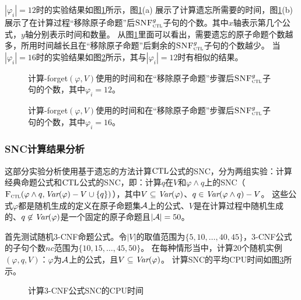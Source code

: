 $|\varphi_i|=12$时的实验结果如图\ref{chapter04:fig:for12}所示，图\ref{chapter04:fig:for12}(a) 展示了计算遗忘所需要的时间，图\ref{chapter04:fig:for12}(b)展示了在计算过程“移除原子命题”后${\textsc{SNF}_{\textsc{ctl}}^g}$子句的个数。其中$x$轴表示第几个公式，$y$轴分别表示时间和数量。
从图\ref{chapter04:fig:for12}里面可以看出，需要遗忘的原子命题个数越多，所用时间越长且在“移除原子命题”后剩余的${\textsc{SNF}_{\textsc{ctl}}^g}$子句的个数越少。
当$|\varphi_i|=16$时的实验结果如图\ref{chapter04:fig:for16}所示，其与$|\varphi_i|=12$时有相似的结果。

\begin{figure*}[!htb]
	\centering
	\caption{计算{\CTL-forget}$(\varphi, V)$使用的时间和在“移除原子命题”步骤后${\textsc{SNF}_{\textsc{ctl}}^g}$子句的个数，其中$\varphi_i=12$。}
	\label{chapter04:fig:for12}
\end{figure*}

\begin{figure*}[!htb]
	\centering
	\caption{计算{\CTL-forget}$(\varphi, V)$使用的时间和在“移除原子命题”步骤后${\textsc{SNF}_{\textsc{ctl}}^g}$子句的个数，其中$\varphi_i=16$。}
	\label{chapter04:fig:for16}
\end{figure*}

\subsubsection{SNC计算结果分析}
这部分实验分析使用基于遗忘的方法计算$\textrm{CTL}$公式的SNC，分为两组实验：计算经典命题公式和$\textrm{CTL}$公式的SNC，即：计算$q$在$V$和$\varphi \wedge q$上的SNC（${\textsc{F}_{\textsc{ctl}}}(\varphi\wedge q, \textit{Var}(\varphi)-V \cup \{q\})$），其中$V\subseteq \textit{Var}(\varphi)$、$q\in \textit{Var}(\varphi\wedge q)-V$。
这些公式$\varphi$都是随机生成的定义在原子命题集${\cal A}$上的公式、$V$是在计算过程中随机生成的、$q\not \in \textit{Var}(\varphi)$是一个固定的原子命题且$|{\cal A}|=50$。

首先测试随机3-CNF命题公式。令$|V|$的取值范围为$\{5,10,\dots, 40,45\}$，3-CNF公式的子句个数$nc$范围为$\{10,15,\dots, 45,50\}$。
在每种情形当中，计算20个随机实例$(\varphi,q,V)$：$\varphi$为${\cal A}$上的公式，且$V\subseteq \textit{Var}(\varphi)$。
计算SNC的平均CPU时间如图\ref{chapter04:fig:ProTime}所示。

\begin{figure*}[!htb]
	\centering
	\caption{%
		计算3-CNF公式SNC的CPU时间}
	\label{chapter04:fig:ProTime}
\end{figure*}


